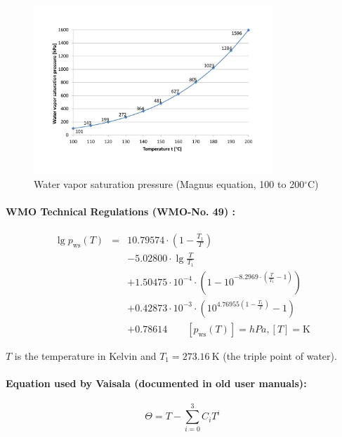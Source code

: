 \documentclass[11pt,a4paper,english,twoside]{scrreprt}
\newcommand{\gradC}{${}^\circ$C}      %
\begin{document}
\begin{figure}
  \centering
  \includegraphics*[width=0.8\textwidth,angle=0]{FCF_Diag_pws2.pdf}
  \caption[Water vapor saturation pressure (Magnus equation)]{Water vapor saturation pressure (Magnus equation, 100 to 200\gradC)}
\end{figure}

\paragraph{WMO Technical Regulations (WMO-No. 49) \cite{WMO49}:}

\begin{eqnarray}
  \lg p_\text{ws}(T) &=& 10.79574 \cdot \left(1 - \frac{T_1}{T}\right)  \\
                    & & - 5.02800 \cdot \lg \frac{T}{T_1}  \nonumber \\
                    & & + 1.50475 \cdot 10^{-4} \cdot \left(1 - 10^{-8.2969 \cdot \left(\frac{T}{T_1}-1\right)}\right) \nonumber \\
                    & & + 0.42873 \cdot 10^{-3} \cdot \left(10^{4.769 55 \left(1-\frac{T_1}{T}\right)}-1 \right) \nonumber \\
                    & & + 0.78614 \qquad [p_\text{ws}(T)] = \si{hPa}, [T] = \si{\kelvin} \nonumber
\end{eqnarray}

$T$ is the temperature in Kelvin and $T_1 = \SI{273.16}{\kelvin}$ (the triple point of water).   

\paragraph{Equation used by Vaisala (documented in old user manuals):}
\[\Theta = T - \sum_{i=0}^3 C_i T^i\]
\end{document}
